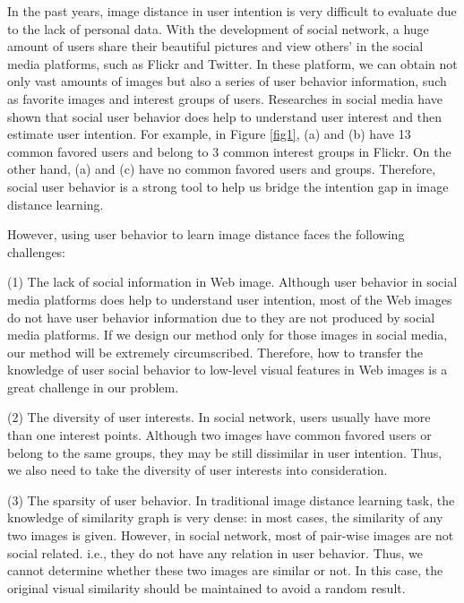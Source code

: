 In the past years, image distance in user intention is very difficult to evaluate due to the lack of personal data. With the development of social network, a huge amount of users share their beautiful pictures and view others' in the social media platforms, such as Flickr and Twitter. In these platform, we can obtain not only vast amounts of images but also a series of user behavior information, such as favorite images and interest groups of users.  Researches in social media\cite{social_visual} have shown that social user behavior does help to understand user interest and then estimate user intention. For example, in Figure \ref{fig1}, (a) and (b) have 13 common favored users and belong to 3 common interest groups in Flickr. On the other hand, (a) and (c) have no common favored users and groups. Therefore, social user behavior is a strong tool to help us bridge the intention gap in image distance learning.

However, using user behavior to learn image distance faces the following challenges:

(1) The lack of social information in Web image. Although user behavior in social media platforms does help to understand user intention, most of the Web images do not have user behavior information due to they are not produced by social media platforms. If we design our method only for those images in social media, our method will be extremely circumscribed. Therefore, how to transfer the knowledge of user social behavior to low-level visual features in Web images is a great challenge in our problem.

(2) The diversity of user interests. In social network, users usually have more than one interest points. Although two images have common favored users or belong to the same groups, they may be still dissimilar in user intention. Thus, we also need to take the diversity of user interests into consideration.

(3) The sparsity of user behavior. In traditional image distance learning task, the knowledge of similarity graph is very dense: in most cases, the similarity of any two images is given. However, in social network, most of pair-wise images are not social related. i.e., they do not have any relation in user behavior. Thus, we cannot determine whether these two images are similar or not. In this case, the original visual similarity should be maintained to avoid a random result.

